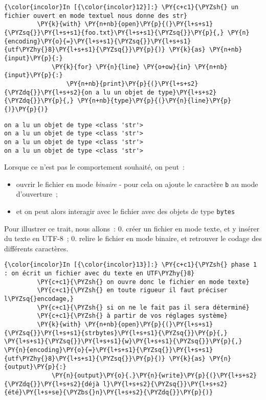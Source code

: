     \begin{Verbatim}[commandchars=\\\{\}]
{\color{incolor}In [{\color{incolor}12}]:} \PY{c+c1}{\PYZsh{} un fichier ouvert en mode textuel nous donne des str}
         \PY{k}{with} \PY{n+nb}{open}\PY{p}{(}\PY{l+s+s1}{\PYZsq{}}\PY{l+s+s1}{foo.txt}\PY{l+s+s1}{\PYZsq{}}\PY{p}{,} \PY{n}{encoding}\PY{o}{=}\PY{l+s+s1}{\PYZsq{}}\PY{l+s+s1}{utf\PYZhy{}8}\PY{l+s+s1}{\PYZsq{}}\PY{p}{)} \PY{k}{as} \PY{n+nb}{input}\PY{p}{:}
             \PY{k}{for} \PY{n}{line} \PY{o+ow}{in} \PY{n+nb}{input}\PY{p}{:}
                 \PY{n+nb}{print}\PY{p}{(}\PY{l+s+s2}{\PYZdq{}}\PY{l+s+s2}{on a lu un objet de type}\PY{l+s+s2}{\PYZdq{}}\PY{p}{,} \PY{n+nb}{type}\PY{p}{(}\PY{n}{line}\PY{p}{)}\PY{p}{)}
\end{Verbatim}


    \begin{Verbatim}[commandchars=\\\{\}]
on a lu un objet de type <class 'str'>
on a lu un objet de type <class 'str'>
on a lu un objet de type <class 'str'>
on a lu un objet de type <class 'str'>

    \end{Verbatim}

    Lorsque ce n'est pas le comportement souhaité, on peut~:
    
\begin{itemize}
	\item 
	ouvrir le fichier en mode \emph{binaire} - pour cela on ajoute le caractère
	\texttt{b} au mode d'ouverture~;
	\item
	et on peut alors interagir avec le fichier avec des objets de type \texttt{bytes}
\end{itemize}

    Pour illustrer ce trait, nous allons~: 0. créer un fichier en mode
texte, et y insérer du texte en UTF-8~; 0. relire le fichier en mode
binaire, et retrouver le codage des différents caractères.

    \begin{Verbatim}[commandchars=\\\{\}]
{\color{incolor}In [{\color{incolor}13}]:} \PY{c+c1}{\PYZsh{} phase 1 : on écrit un fichier avec du texte en UTF\PYZhy{}8}
         \PY{c+c1}{\PYZsh{} on ouvre donc le fichier en mode texte}
         \PY{c+c1}{\PYZsh{} en toute rigueur il faut préciser l\PYZsq{}encodage,}
         \PY{c+c1}{\PYZsh{} si on ne le fait pas il sera déterminé}
         \PY{c+c1}{\PYZsh{} à partir de vos réglages système}
         \PY{k}{with} \PY{n+nb}{open}\PY{p}{(}\PY{l+s+s1}{\PYZsq{}}\PY{l+s+s1}{strbytes}\PY{l+s+s1}{\PYZsq{}}\PY{p}{,} \PY{l+s+s1}{\PYZsq{}}\PY{l+s+s1}{w}\PY{l+s+s1}{\PYZsq{}}\PY{p}{,} \PY{n}{encoding}\PY{o}{=}\PY{l+s+s1}{\PYZsq{}}\PY{l+s+s1}{utf\PYZhy{}8}\PY{l+s+s1}{\PYZsq{}}\PY{p}{)} \PY{k}{as} \PY{n}{output}\PY{p}{:}
             \PY{n}{output}\PY{o}{.}\PY{n}{write}\PY{p}{(}\PY{l+s+s2}{\PYZdq{}}\PY{l+s+s2}{déjà l}\PY{l+s+s2}{\PYZsq{}}\PY{l+s+s2}{été}\PY{l+s+se}{\PYZbs{}n}\PY{l+s+s2}{\PYZdq{}}\PY{p}{)}
\end{Verbatim}


